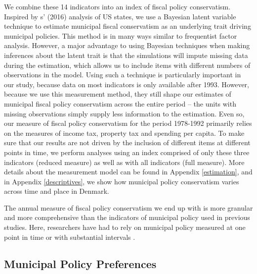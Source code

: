 \documentclass[a4paper,12pt]{article}
\begin{document}
We combine these 14 indicators into an index of fiscal policy conservatism. Inspired by \citeauthor{caughey2016dynamics}s' (2016) analysis of US states, we use a Bayesian latent variable technique to estimate municipal fiscal conservatism as an underlying trait driving municipal policies.  This method is in many ways similar to frequentist factor analysis. However, a major advantage to using Bayesian techniques when making inferences about the latent trait is that the simulations will impute missing data during the estimation, which allows us to include items with different numbers of observations in the model. Using such a technique is particularly important in our study, because data on most indicators is only available after 1993. However, because we use this measurement method, they still shape our estimates of municipal fiscal policy conservatism across the entire period -- the units with missing observations simply supply less information to the estimation. Even so, our measure of fiscal policy conservatism for the period 1978-1992 primarily relies on the measures of income tax, property tax and spending per capita. To make sure that our results are not driven by the inclusion of different items at different points in time, we perform analyses using an index comprised of only these three indicators (reduced measure) as well as with all indicators (full measure). More details about the measurement model can be found in Appendix \ref{estimation}, and in Appendix \ref{descriptives}, we show how municipal policy conservatism varies across time and place in Denmark.

The annual measure of fiscal policy conservatism we end up with is more granular and more comprehensive than the indicators of municipal policy used in previous studies. Here, researchers have had to rely on municipal policy measured at one point in time \citep{tausanovitch2014representation,palus2010responsiveness} or  with substantial intervals \citep{sances2017voters,einstein2016pushing,hajnal2010or}. 



\subsection*{Municipal Policy Preferences}
\end{document}

